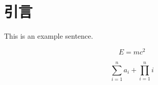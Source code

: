 
\chapter{引言}
\pkuthssffaq %

This is an example sentence.

\begin{equation}
    E = mc^{2}
\end{equation}

\begin{equation}
    \sum_{i=1}^{n} a_i + \prod_{i=1}^{n} i
\end{equation}

